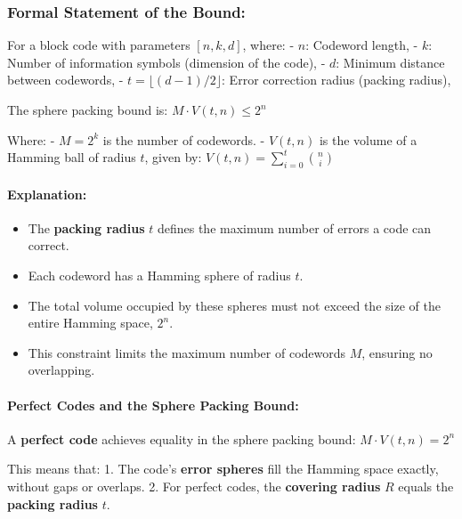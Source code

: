 \documentclass[11pt]{article}
\providecommand{\tightlist}{%
      \setlength{\itemsep}{0pt}\setlength{\parskip}{0pt}}
\begin{document}
\subsubsection{\texorpdfstring{\textbf{Formal Statement of the
Bound:}}{Formal Statement of the Bound:}}\label{formal-statement-of-the-bound}

For a block code with parameters \([n, k, d]\), where: - \(n\): Codeword
length, - \(k\): Number of information symbols (dimension of the code),
- \(d\): Minimum distance between codewords, -
\(t = \lfloor (d-1)/2 \rfloor\): Error correction radius (packing
radius),

The sphere packing bound is: \(M \cdot V(t, n) \leq 2^n\)

Where: - \(M = 2^k\) is the number of codewords. - \(V(t, n)\) is the
volume of a Hamming ball of radius \(t\), given by:
\(V(t, n) = \sum_{i=0}^{t} \binom{n}{i}\)

\paragraph{\texorpdfstring{\textbf{Explanation:}}{Explanation:}}\label{explanation}

\begin{itemize}
\tightlist
\item
  The \textbf{packing radius} \(t\) defines the maximum number of errors
  a code can correct.
\item
  Each codeword has a Hamming sphere of radius \(t\).
\item
  The total volume occupied by these spheres must not exceed the size of
  the entire Hamming space, \(2^n\).
\item
  This constraint limits the maximum number of codewords \(M\), ensuring
  no overlapping.
\end{itemize}

\paragraph{\texorpdfstring{\textbf{Perfect Codes and the Sphere Packing
Bound:}}{Perfect Codes and the Sphere Packing Bound:}}\label{perfect-codes-and-the-sphere-packing-bound}

A \textbf{perfect code} achieves equality in the sphere packing bound:
\(M \cdot V(t, n) = 2^n\)

This means that: 1. The code's \textbf{error spheres} fill the Hamming
space exactly, without gaps or overlaps. 2. For perfect codes, the
\textbf{covering radius} \(R\) equals the \textbf{packing radius} \(t\).
\end{document}
